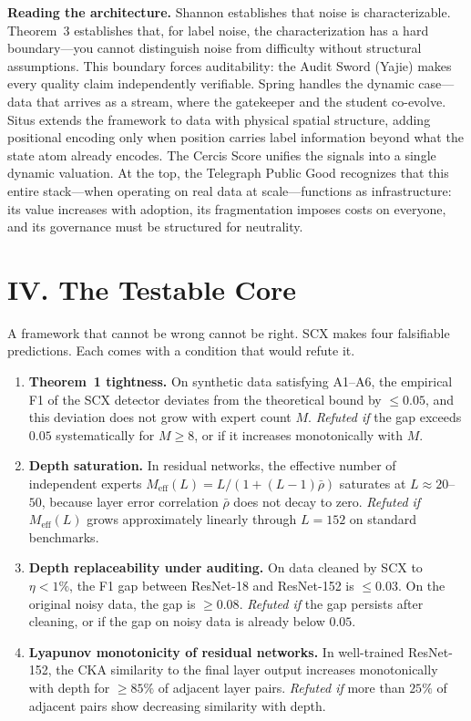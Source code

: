 \documentclass[11pt,a4paper]{article}
\theoremstyle{definition}
\begin{document}
\noindent\textbf{Reading the architecture.} Shannon establishes that noise is characterizable. Theorem~3 establishes that, for label noise, the characterization has a hard boundary---you cannot distinguish noise from difficulty without structural assumptions. This boundary forces auditability: the Audit Sword (Yajie) makes every quality claim independently verifiable. Spring handles the dynamic case---data that arrives as a stream, where the gatekeeper and the student co-evolve. Situs extends the framework to data with physical spatial structure, adding positional encoding only when position carries label information beyond what the state atom already encodes. The Cercis Score unifies the signals into a single dynamic valuation. At the top, the Telegraph Public Good recognizes that this entire stack---when operating on real data at scale---functions as infrastructure: its value increases with adoption, its fragmentation imposes costs on everyone, and its governance must be structured for neutrality.

\section*{IV. The Testable Core}

A framework that cannot be wrong cannot be right. SCX makes four falsifiable predictions. Each comes with a condition that would refute it.

\begin{enumerate}[leftmargin=*,itemsep=0.5em]

\item \textbf{Theorem~1 tightness.} On synthetic data satisfying A1--A6, the empirical F1 of the SCX detector deviates from the theoretical bound by $\leq 0.05$, and this deviation does not grow with expert count $M$. \textit{Refuted if} the gap exceeds $0.05$ systematically for $M \geq 8$, or if it increases monotonically with $M$.

\item \textbf{Depth saturation.} In residual networks, the effective number of independent experts $M_{\text{eff}}(L) = L / (1 + (L-1)\bar{\rho})$ saturates at $L \approx 20$--$50$, because layer error correlation $\bar{\rho}$ does not decay to zero. \textit{Refuted if} $M_{\text{eff}}(L)$ grows approximately linearly through $L=152$ on standard benchmarks.

\item \textbf{Depth replaceability under auditing.} On data cleaned by SCX to $\eta < 1\%$, the F1 gap between ResNet-18 and ResNet-152 is $\leq 0.03$. On the original noisy data, the gap is $\geq 0.08$. \textit{Refuted if} the gap persists after cleaning, or if the gap on noisy data is already below $0.05$.

\item \textbf{Lyapunov monotonicity of residual networks.} In well-trained ResNet-152, the CKA similarity to the final layer output increases monotonically with depth for $\geq 85\%$ of adjacent layer pairs. \textit{Refuted if} more than $25\%$ of adjacent pairs show decreasing similarity with depth.

\end{enumerate}
\end{document}
